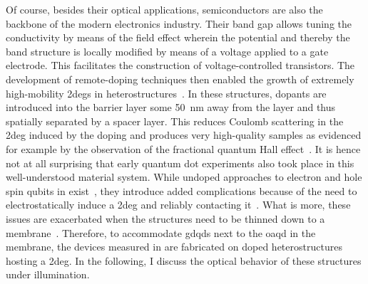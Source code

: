 Of course, besides their optical applications, semiconductors are also the backbone of the modern electronics industry.
Their band gap allows tuning the conductivity by means of the field effect wherein the potential and thereby the band structure is locally modified by means of a voltage applied to a gate electrode.
This facilitates the construction of voltage-controlled transistors.
The development of remote-doping techniques then enabled the growth of extremely high-mobility \glspl{2deg} in \GaAsAlGaAs heterostructures~\cite{Ihn2009}.
In these structures, dopants are introduced into the  barrier layer some \qty{50}{\nano\meter} away from the  layer and thus spatially separated by a  spacer layer.
This reduces Coulomb scattering in the \gls{2deg} induced by the doping and produces very high-quality samples as evidenced for example by the observation of the fractional quantum Hall effect~\cite{Stormer1999a}.
It is hence not at all surprising that early quantum dot experiments also took place in this well-understood material system.
While undoped approaches to electron and hole spin qubits in  exist~\cite{Harrell1999,Chen2012,Li2014,Tracy2014}, they introduce added complications because of the need to electrostatically induce a \gls{2deg} and reliably contacting it~\cite{Rossler2016}.
What is more, these issues are exacerbated when the structures need to be thinned down to a membrane~\cite{Descamps2021,Kindel2025}.
Therefore, to accommodate \glspl{gdqd} next to the \gls{oaqd} in the membrane, the devices measured in \thispart are fabricated on doped heterostructures hosting a \gls{2deg}.
In the following, I discuss the optical behavior of these structures under illumination.

